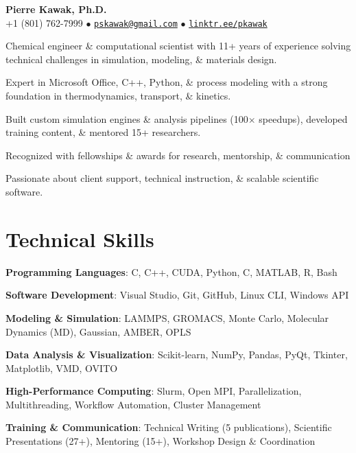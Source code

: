 \begin{center}
  {\LARGE \textbf{Pierre Kawak, Ph.D.} }\\[1ex]
  +1 (801) 762-7999 $\bullet$ \href{mailto:pskawak@gmail.com}{\tt pskawak@gmail.com} $\bullet$ \href{https://linktr.ee/pkawak}{\tt linktr.ee/pkawak}\\
\end{center}
\begin{tabitemize}
  \item Chemical engineer \& computational scientist with 11+ years of experience solving technical challenges in simulation, modeling, \& materials design.
  \item Expert in Microsoft Office, C++, Python, \& process modeling with a strong foundation in thermodynamics, transport, \& kinetics.
  \item Built custom simulation engines \& analysis pipelines (100$\times$ speedups), developed training content, \& mentored 15+ researchers.
  \item Recognized with fellowships \& awards for research, mentorship, \& communication
  \item Passionate about client support, technical instruction, \& scalable scientific software.
\end{tabitemize}
\vspace{-1.0\baselineskip}
\section*{Technical Skills}
\begin{tabitemize}
  \item \textbf{Programming Languages}: C, C++, CUDA, Python, C, MATLAB, R, Bash
  \item \textbf{Software Development}: Visual Studio, Git, GitHub, Linux CLI, Windows API
  \item \textbf{Modeling \& Simulation}: LAMMPS, GROMACS, Monte Carlo, Molecular Dynamics (MD), Gaussian, AMBER, OPLS
  \item \textbf{Data Analysis \& Visualization}: Scikit-learn, NumPy, Pandas, PyQt, Tkinter, Matplotlib, VMD, OVITO
  \item \textbf{High-Performance Computing}: Slurm, Open MPI, Parallelization, Multithreading, Workflow Automation, Cluster Management
  \item \textbf{Training \& Communication}: Technical Writing (5 publications), Scientific Presentations (27+), Mentoring (15+), Workshop Design \& Coordination
\end{tabitemize}
\vspace{-1.0\baselineskip}
